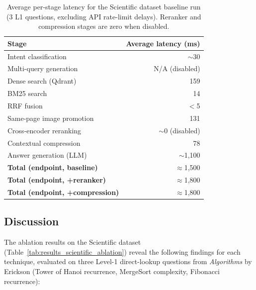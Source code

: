 \documentclass[12pt,a4paper]{article}
\begin{document}
\begin{table}[H]
  \centering
  \caption{Average per-stage latency for the Scientific dataset baseline run (3 L1 questions,
           excluding API rate-limit delays). Reranker and compression stages are zero when disabled.}
  \label{tab:latency}
  \begin{tabular}{lr}
    \toprule
    \textbf{Stage} & \textbf{Average latency (ms)} \\
    \midrule
    Intent classification          & $\sim$30 \\
    Multi-query generation         & N/A (disabled) \\
    Dense search (Qdrant)          & 159 \\
    BM25 search                    & 14 \\
    RRF fusion                     & $<$5 \\
    Same-page image promotion      & 131 \\
    Cross-encoder reranking        & $\sim$0 (disabled) \\
    Contextual compression         & 78 \\
    Answer generation (LLM)        & $\sim$1{,}100 \\
    \midrule
    \textbf{Total (endpoint, baseline)} & $\approx$1{,}500 \\
    \textbf{Total (endpoint, +reranker)} & $\approx$1{,}800 \\
    \textbf{Total (endpoint, +compression)} & $\approx$1{,}800 \\
    \bottomrule
  \end{tabular}
\end{table}

\subsection{Discussion}

The ablation results on the Scientific dataset (Table~\ref{tab:results_scientific_ablation}) reveal
the following findings for each technique, evaluated on three Level-1 direct-lookup questions from
\emph{Algorithms} by Erickson (Tower of Hanoi recurrence, MergeSort complexity, Fibonacci recurrence):
\end{document}
